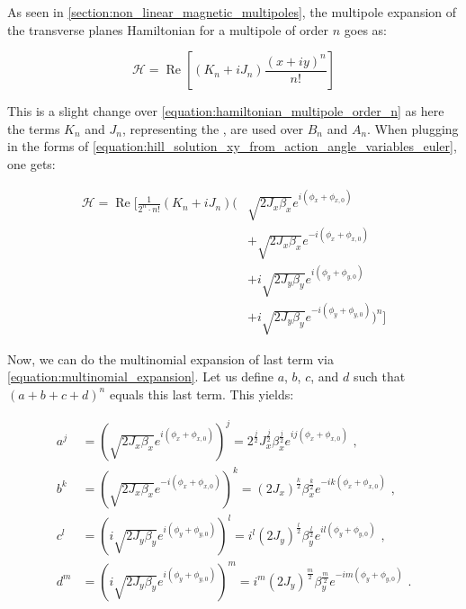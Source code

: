 As seen in \cref{section:non_linear_magnetic_multipoles}, the multipole expansion of the transverse planes Hamiltonian for a multipole of order \(n\) goes as:

\begin{equation}
    \mathcal{H} = \operatorname{Re} \left[ (K_n + i J_n) \frac{(x + i y)^n}{n!} \right]
\end{equation}

This is a slight change over \cref{equation:hamiltonian_multipole_order_n} as here the terms \(K_n\) and \(J_n\), representing the , are used over \(B_n\) and \(A_n\).
When plugging in the forms of \cref{equation:hill_solution_xy_from_action_angle_variables_euler}, one gets:

\begin{equation}
    \begin{aligned}
        \mathcal{H} = \operatorname{Re} \biggl[
            \frac{1}{2^n \cdot n!}  (K_n + iJ_n)
            \biggl(
                & \sqrt{2 J_x \beta_x} e^{i \left( \phi_x + \phi_{x,0} \right)}\\
                & + \sqrt{2 J_x \beta_x} e^{-i \left(\phi_x + \phi_{x,0} \right)}\\
                & + i \sqrt{2 J_y \beta_y} e^{i \left(\phi_y+ \phi_{y,0} \right)} \\
                & + i \sqrt{2 J_y \beta_y} e^{-i \left(\phi_y + \phi_{y,0} \right)} 
            \biggr)^n 
            \biggr]
    \end{aligned}
    \label{equation:hamiltonian_multipole_order_n_xy}
\end{equation}

Now, we can do the multinomial expansion of last term via \cref{equation:multinomial_expansion}.
Let us define \(a\), \(b\), \(c\), and \(d\) such that \(\left( a + b + c + d \right)^n\) equals this last term.
This yields:

\begin{equation}
    \begin{aligned}
        a^j &= \left( \sqrt{2 J_x \beta_x} e^{i \left( \phi_x + \phi_{x,0} \right)} \right)^j = 2^{\frac{j}{2}} J_x^{\frac{j}{2}} \beta_x^{\frac{j}{2}} e^{i j \left( \phi_x + \phi_{x,0} \right)} \text{ ,} \\
        b^k &= \left( \sqrt{2 J_x \beta_x} e^{-i \left( \phi_x + \phi_{x,0} \right)} \right)^k = (2 J_x)^{\frac{k}{2}} \beta_x^{\frac{k}{2}} e^{-i k \left( \phi_x + \phi_{x,0} \right)}           \text{ ,} \\
        c^l &= \left( i \sqrt{2 J_y \beta_y} e^{i \left( \phi_y + \phi_{y,0} \right)} \right)^l = i^l  (2 J_y)^{\frac{l}{2}} \beta_y^{\frac{l}{2}} e^{i l \left( \phi_y + \phi_{y,0} \right)}      \text{ ,} \\
        d^m &= \left( i \sqrt{2 J_y \beta_y} e^{i \left( \phi_y + \phi_{y,0} \right)} \right)^m = i^m (2 J_y)^{\frac{m}{2}} \beta_y^{\frac{m}{2}} e^{-i m \left( \phi_y + \phi_{y,0} \right)}      \text{ .} \\
    \end{aligned}
    \label{equation:variables_definition_for_multinomial_expansion}
\end{equation}

